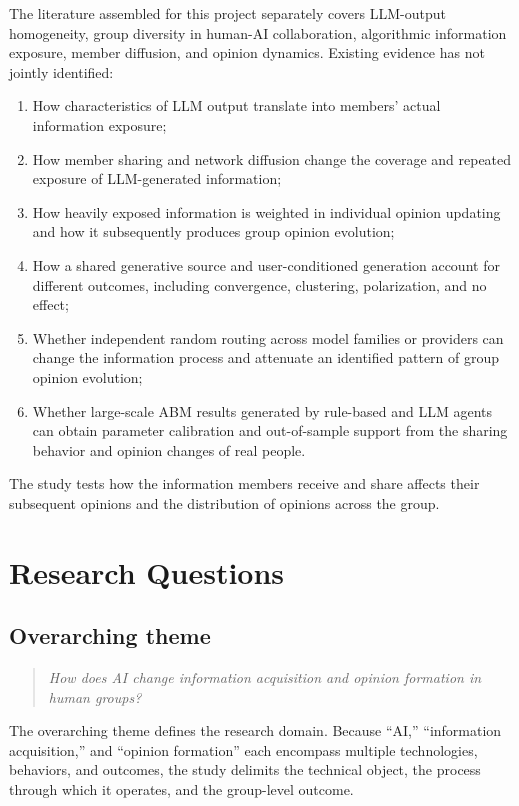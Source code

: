 \documentclass[11pt,a4paper]{article}
\begin{document}
The literature assembled for this project separately covers LLM-output homogeneity, group diversity in human-AI collaboration, algorithmic information exposure, member diffusion, and opinion dynamics. Existing evidence has not jointly identified:

\begin{enumerate}
\item How characteristics of LLM output translate into members' actual information exposure;
\item How member sharing and network diffusion change the coverage and repeated exposure of LLM-generated information;
\item How heavily exposed information is weighted in individual opinion updating and how it subsequently produces group opinion evolution;
\item How a shared generative source and user-conditioned generation account for different outcomes, including convergence, clustering, polarization, and no effect;
\item Whether independent random routing across model families or providers can change the information process and attenuate an identified pattern of group opinion evolution;
\item Whether large-scale ABM results generated by rule-based and LLM agents can obtain parameter calibration and out-of-sample support from the sharing behavior and opinion changes of real people.
\end{enumerate}

The study tests how the information members receive and share affects their subsequent opinions and the distribution of opinions across the group.

\section{Research Questions}

\subsection{Overarching theme}

\begin{quote}\itshape
How does AI change information acquisition and opinion formation in human groups?
\end{quote}

The overarching theme defines the research domain. Because ``AI,'' ``information acquisition,'' and ``opinion formation'' each encompass multiple technologies, behaviors, and outcomes, the study delimits the technical object, the process through which it operates, and the group-level outcome.
\end{document}
